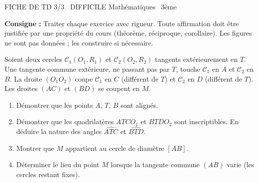\documentclass[11pt]{article}
\begin{document}
\begin{tcolorbox}[enhanced,colback=popink,colframe=popink,arc=10pt,boxrule=0pt,left=12pt,right=12pt,top=9pt,bottom=9pt]
{\color{white}\popxbold\small FICHE DE TD 3/3 \textbullet\ DIFFICILE \hfill Mathématiques \textbullet\ 3ème\par}
\end{tcolorbox}
\vspace{4pt}
\noindent \textbf{Consigne :} Traiter chaque exercice avec rigueur. Toute affirmation doit être justifiée par une propriété du cours (théorème, réciproque, corollaire). Les figures ne sont pas données ; les construire si nécessaire.

\begin{exercice}
Soient deux cercles $\mathcal{C}_1(O_1, R_1)$ et $\mathcal{C}_2(O_2, R_2)$ tangents extérieurement en $T$. Une tangente commune extérieure, ne passant pas par $T$, touche $\mathcal{C}_1$ en $A$ et $\mathcal{C}_2$ en $B$. La droite $(O_1O_2)$ coupe $\mathcal{C}_1$ en $C$ (différent de $T$) et $\mathcal{C}_2$ en $D$ (différent de $T$). Les droites $(AC)$ et $(BD)$ se coupent en $M$.
\begin{enumerate}
    \item Démontrer que les points $A$, $T$, $B$ sont alignés.
    \item Démontrer que les quadrilatères $ATCO_1$ et $BTDO_2$ sont inscriptibles. En déduire la nature des angles $\widehat{ATC}$ et $\widehat{BTD}$.
    \item Montrer que $M$ appartient au cercle de diamètre $[AB]$.
    \item Déterminer le lieu du point $M$ lorsque la tangente commune $(AB)$ varie (les cercles restant fixes).
\end{enumerate}
\end{exercice}
\end{document}
